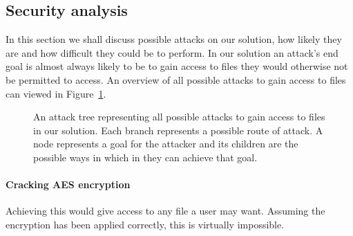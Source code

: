\documentclass[12pt, titlepage]{article}
\begin{document}
\subsection{Security analysis}
In this section we shall discuss possible attacks on our solution, how likely they are and how difficult they could be to perform.
\newline \indent In our solution an attack's end goal is almost always likely to be to gain access to files they would otherwise not be permitted to access.
\newline \indent An overview of all possible attacks to gain access to files can viewed in Figure~\ref{fig:attackTree}.

\begin{landscape}
\begin{figure}

\caption{An attack tree representing all possible attacks to gain access to files in our solution. Each branch represents a possible route of attack. A node represents a goal for the attacker and its children are the possible ways in which in they can achieve that goal.}
\label{fig:attackTree}
\end{figure}
\end{landscape}

\paragraph*{Cracking AES encryption} Achieving this would give access to any file a user may want. Assuming the encryption has been applied correctly, this is virtually impossible.
\end{document}
